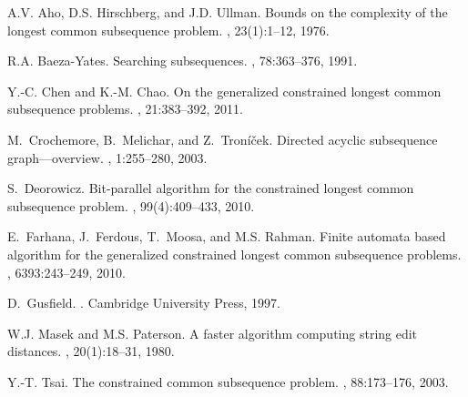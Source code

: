 \documentclass[12pt]{article}
\begin{document}
\begin{thebibliography}{1}

A.V. Aho, D.S. Hirschberg, and J.D. Ullman.
\newblock Bounds on the complexity of the longest common subsequence problem.
, 23(1):1--12, 1976.

R.A. Baeza-Yates.
\newblock Searching subsequences.
, 78:363--376, 1991.

Y.-C. Chen and K.-M. Chao.
\newblock On the generalized constrained longest common subsequence problems.
, 21:383--392, 2011.

M.~Crochemore, B.~Melichar, and Z.~Tron{\'i}{\v{c}}ek.
\newblock Directed acyclic subsequence graph---overview.
, 1:255--280, 2003.

S.~Deorowicz.
\newblock Bit-parallel algorithm for the constrained longest common subsequence
  problem.
, 99(4):409--433, 2010.

E.~Farhana, J.~Ferdous, T.~Moosa, and M.S. Rahman.
\newblock Finite automata based algorithm for the generalized constrained
  longest common subsequence problems.
, 6393:243--249, 2010.

D.~Gusfield.
.
\newblock Cambridge University Press, 1997.

W.J. Masek and M.S. Paterson.
\newblock A faster algorithm computing string edit distances.
, 20(1):18--31, 1980.

Y.-T. Tsai.
\newblock The constrained common subsequence problem.
, 88:173--176, 2003.

\end{thebibliography}
 
\end{document}
